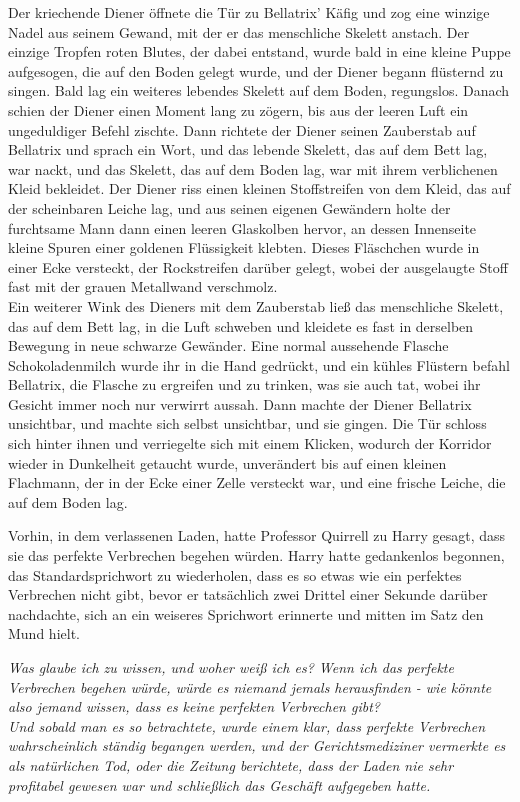 {Der kriechende Diener öffnete die Tür zu Bellatrix' Käfig und zog eine winzige Nadel aus seinem Gewand, mit der er das menschliche Skelett anstach. Der einzige Tropfen roten Blutes, der dabei entstand, wurde bald in eine kleine Puppe aufgesogen, die auf den Boden gelegt wurde, und der Diener begann flüsternd zu singen. Bald lag ein weiteres lebendes Skelett auf dem Boden, regungslos. Danach schien der Diener einen Moment lang zu zögern, bis aus der leeren Luft ein ungeduldiger Befehl zischte. Dann richtete der Diener seinen Zauberstab auf Bellatrix und sprach ein Wort, und das lebende Skelett, das auf dem Bett lag, war nackt, und das Skelett, das auf dem Boden lag, war mit ihrem verblichenen Kleid bekleidet. Der Diener riss einen kleinen Stoffstreifen von dem Kleid, das auf der scheinbaren Leiche lag, und aus seinen eigenen Gewändern holte der furchtsame Mann dann einen leeren Glaskolben hervor, an dessen Innenseite kleine Spuren einer goldenen Flüssigkeit klebten. Dieses Fläschchen wurde in einer Ecke versteckt, der Rockstreifen darüber gelegt, wobei der ausgelaugte Stoff fast mit der grauen Metallwand verschmolz.\\ Ein weiterer Wink des Dieners mit dem Zauberstab ließ das menschliche Skelett, das auf dem Bett lag, in die Luft schweben und kleidete es fast in derselben Bewegung in neue schwarze Gewänder. Eine normal aussehende Flasche Schokoladenmilch wurde ihr in die Hand gedrückt, und ein kühles Flüstern befahl Bellatrix, die Flasche zu ergreifen und zu trinken, was sie auch tat, wobei ihr Gesicht immer noch nur verwirrt aussah. Dann machte der Diener Bellatrix unsichtbar, und machte sich selbst unsichtbar, und sie gingen. Die Tür schloss sich hinter ihnen und verriegelte sich mit einem Klicken, wodurch der Korridor wieder in Dunkelheit getaucht wurde, unverändert bis auf einen kleinen Flachmann, der in der Ecke einer Zelle versteckt war, und eine frische Leiche, die auf dem Boden lag.

Vorhin, in dem verlassenen Laden, hatte Professor Quirrell zu Harry gesagt, dass sie das perfekte Verbrechen begehen würden. Harry hatte gedankenlos begonnen, das Standardsprichwort zu wiederholen, dass es so etwas wie ein perfektes Verbrechen nicht gibt, bevor er tatsächlich zwei Drittel einer Sekunde darüber nachdachte, sich an ein weiseres Sprichwort erinnerte und mitten im Satz den Mund hielt.

\emph{Was glaube ich zu wissen, und woher weiß ich es? Wenn ich das perfekte Verbrechen begehen würde, würde es niemand jemals herausfinden - wie könnte also jemand wissen, dass es keine perfekten Verbrechen gibt?}\\ \emph{Und sobald man es so betrachtete, wurde einem klar, dass perfekte Verbrechen wahrscheinlich ständig begangen werden, und der Gerichtsmediziner vermerkte es als natürlichen Tod, oder die Zeitung berichtete, dass der Laden nie sehr profitabel gewesen war und schließlich das Geschäft aufgegeben hatte.}

}

